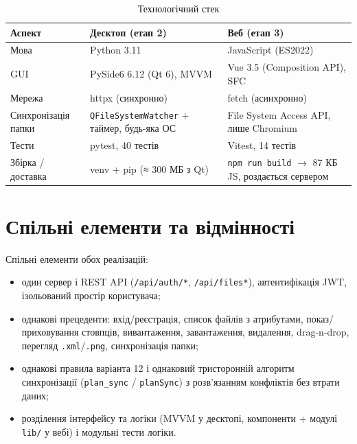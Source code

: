 \documentclass[12pt,a4paper]{article}
\begin{document}
{\small
\begin{longtable}{@{}p{4cm}p{6cm}p{6cm}@{}}
\caption{Технологічний стек}\\
\toprule
\textbf{Аспект} & \textbf{Десктоп (етап 2)} & \textbf{Веб (етап 3)} \\
\midrule
\endhead
Мова & Python 3.11 & JavaScript (ES2022) \\ \midrule
GUI & PySide6 6.12 (Qt 6), MVVM & Vue 3.5 (Composition API), SFC \\ \midrule
Мережа & httpx (синхронно) & fetch (асинхронно) \\ \midrule
Синхронізація папки & \texttt{QFileSystemWatcher} + таймер, будь-яка ОС & File System Access API, лише Chromium \\ \midrule
Тести & pytest, 40 тестів & Vitest, 14 тестів \\ \midrule
Збірка / доставка & venv + pip (≈ 300 МБ з Qt) & \texttt{npm run build} $\to$ 87 КБ JS, роздається сервером \\ \midrule
\bottomrule
\end{longtable}}


\section{Спільні елементи та відмінності}

Спільні елементи обох реалізацій:

\begin{itemize}[nosep]
    \item один сервер і REST API (\texttt{/\allowbreak{}api/\allowbreak{}auth/\allowbreak{}*}, \texttt{/\allowbreak{}api/\allowbreak{}files*}), автентифікація JWT, ізольований простір користувача;
    \item однакові прецеденти: вхід/реєстрація, список файлів з атрибутами, показ/приховування стовпців, вивантаження, завантаження, видалення, drag-n-drop, перегляд \texttt{.xml}/\texttt{.png}, синхронізація папки;
    \item однакові правила варіанта 12 і однаковий тристоронній алгоритм синхронізації (\texttt{plan\_sync} / \texttt{planSync}) з розв'язанням конфліктів без втрати даних;
    \item розділення інтерфейсу та логіки (MVVM у десктопі, компоненти + модулі \texttt{lib/\allowbreak{}} у вебі) і модульні тести логіки.
\end{itemize}
\end{document}

